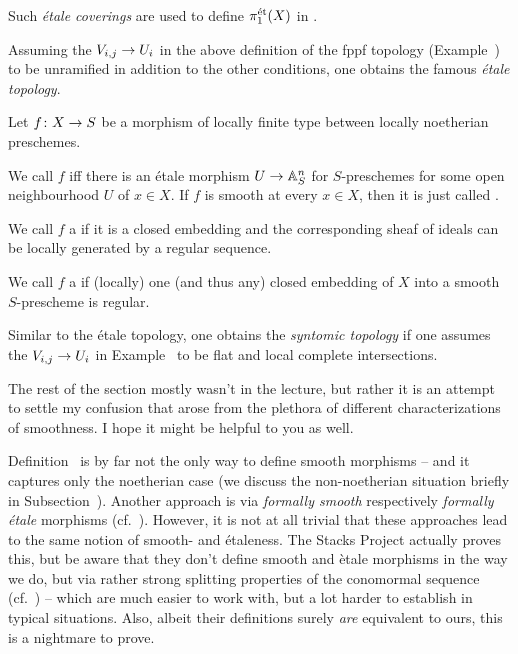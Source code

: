 \documentclass[a4paper,parskip=half,numbers=enddot, DIV=12]{scrreprt}
\begin{document}
\begin{rem}
	\begin{alphanumerate}
		\item {}Such \emph{étale coverings} are used to define  $\pi_1^{\mathrm{\acute{e}t}}(X)$ in \cite{sga1}.
		\item Assuming the $V_{i,j}\morphism U_i$ in the above definition of the fppf topology (Example~) to be unramified in addition to the other conditions, one obtains the famous \emph{étale topology}.
	\end{alphanumerate}
\end{rem}
\begin{defi}
	Let $f\colon X\morphism S$ be a morphism of locally finite type between locally noetherian preschemes.
	\begin{alphanumerate}
		\item We call $f$  iff there is an étale morphism $U\morphism \IA_S^n$ for $S$-preschemes for some open neighbourhood $U$ of $x\in X$. If $f$ is smooth at every $x\in X$, then it is just called \defemph{smooth}.
		\item We call $f$ a  if it is a closed embedding and the corresponding sheaf of ideals can be locally generated by a regular sequence.
		\item We call $f$ a  if (locally) one (and thus any) closed embedding of $X$ into a smooth $S$-prescheme is regular.
	\end{alphanumerate}
\end{defi}
\begin{rem}
	Similar to the étale topology, one obtains the \emph{syntomic topology} if one assumes the $V_{i,j}\morphism U_i$ in Example~ to  be flat and local complete intersections.
\end{rem}
The rest of the section mostly wasn't in the lecture, but rather it is an attempt to settle my confusion that arose from the plethora of different characterizations of smoothness. I hope it might be helpful to you as well.

Definition~ is by far not the only way to define smooth morphisms -- and it captures only the noetherian case (we discuss the non-noetherian situation briefly in Subsection~). Another approach is via \emph{formally smooth} respectively \emph{formally étale} morphisms (cf.\ \cite[ and ]{stacks-project}). However, it is not at all trivial that these approaches lead to the same notion of smooth- and étaleness. The Stacks Project actually proves this, but be aware that they don't define smooth and ètale morphisms in the way we do, but via rather strong splitting properties of the conomormal sequence (cf.\ \cite[ and ]{stacks-project}) -- which are much easier to work with, but a lot harder to establish in typical situations. Also, albeit their definitions surely \emph{are} equivalent to ours, this is a nightmare to prove.
\end{document}
